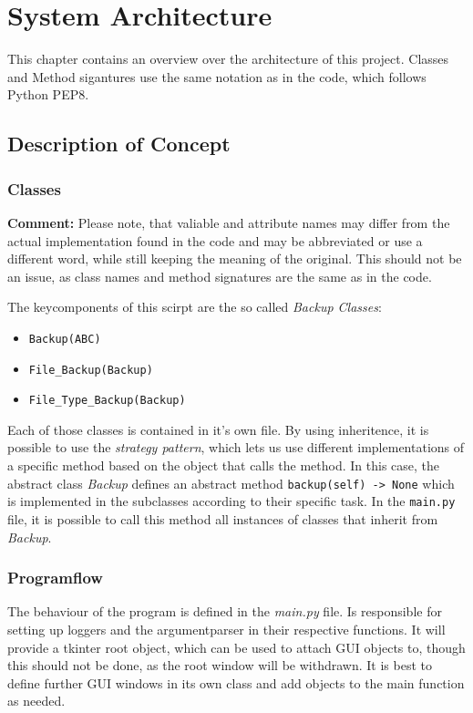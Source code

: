 \chapter{System Architecture}
This chapter contains an overview over the architecture of this project. Classes and Method sigantures
use the same notation as in the code, which follows Python PEP8.

\section{Description of Concept}

\subsection{Classes}
\textbf{Comment:} Please note, that valiable and attribute names may differ from the actual implementation
found in the code and may be abbreviated or use a different word, while still keeping the meaning of the 
original. This should not be an issue, as class names and method signatures are the same as in the code.

The keycomponents of this scirpt are the so called \emph{Backup Classes}:

\begin{itemize}
    \item \verb|Backup(ABC)|
    \item \verb|File_Backup(Backup)|
    \item \verb|File_Type_Backup(Backup)|
\end{itemize}

Each of those classes is contained in it's own file. By using inheritence, it is possible to 
use the \emph{strategy pattern}, which lets us use different implementations of a specific method
based on the object that calls the method.  In this case, the abstract class \emph{Backup} 
defines an abstract method \verb|backup(self) -> None| which is implemented in the subclasses 
according to their specific task. In the \verb|main.py| file, it is possible to call this method
all instances of classes that inherit from \emph{Backup}.


\subsection{Programflow}    %
The behaviour of the program is defined in the \emph{main.py} file. Is responsible for setting up
loggers and the argumentparser in their respective functions. It will provide a tkinter root object, which
can be used to attach GUI objects to, though this should not be done, as the root window will be withdrawn.
It is best to define further GUI windows in its own class and add objects to the main function as needed.

